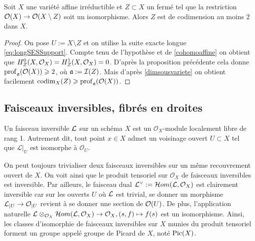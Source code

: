 \begin{cor}\label{cohomcodimgeq2}
Soit $X$ une variété affine irréductible et $Z\subset X$ un fermé tel que la restriction $\mathcal{O}(X)\rightarrow \mathcal{O}(X\setminus Z)$ soit un isomorphisme. Alors $Z$ est de codimension au moins $2$ dans $X$.
\end{cor}
\begin{proof}
On pose $U:=X\setminus Z$ et on utilise la suite exacte longue \ref{eq:longSESSupport}. Compte tenu de l'hypothèse et de \ref{cohomoaffine} on obtient que $H^0_Z(X,\mathcal{O}_X)=H^1_Z(X,\mathcal{O}_X)=0$. D'après la proposition précédente cela donne $\operatorname{prof}_\mathfrak{a}(\mathcal{O}(X))\geqslant 2$, où $\mathfrak{a}:=\mathcal{I}(Z)$. Mais d'après \ref{dimsousvariete} on obtient facilement $\operatorname{codim}_X(Z)\geqslant \operatorname{prof}_\mathfrak{a}(\mathcal{O}(X))$.
\end{proof}


\subsection{Faisceaux inversibles, fibrés en droites}
\begin{defn}
Un faisceau inversible $\mathcal{L}$ sur un schéma $X$ est un $\mathcal{O}_X$-module localement libre de rang 1. Autrement dit, tout point $x\in X$ admet un voisinage ouvert $U \subset X$ tel que ${\mathcal L}|_U$ est isomorphe à ${\mathcal O}_U$.
\end{defn}

On peut toujours trivialiser deux faisceaux inversibles sur un même recouvrement ouvert de $X$. On voit ainsi que le produit tensoriel sur $\mathcal{O}_X$ de faisceaux inversibles est inversible. Par ailleurs, le faisceau dual $\mathcal{L}^\vee:=\mathcal{H} om(\mathcal{L},\mathcal{O}_X)$ est clairement inversible car sur les ouverts $U$ où $\mathcal{L}$ est trivial, se donner un morphisme $\mathcal{L}_{|U}\rightarrow\mathcal{O}_{|U}$ revient à se donner une section de $\mathcal{O}(U)$. De plus, l'application naturelle $\mathcal{L}\otimes_{\mathcal{O}_X} \mathcal{H} om(\mathcal{L},\mathcal{O}_X)\rightarrow \mathcal{O}_X, (s,f)\mapsto f(s)$ est un isomorphisme. Ainsi, les classes d'isomorphie de faisceaux inversibles sur $X$ munies du produit tensoriel forment un groupe appelé groupe de Picard de $X$, noté $\operatorname{Pic}(X)$. 


